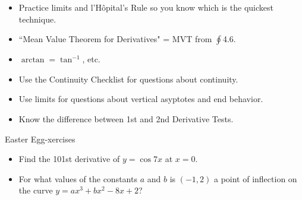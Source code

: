\documentclass[14pt]{beamer}
\begin{document}
\begin{frame}
\footnotesize
\begin{itemize}
\item Practice limits and l'H\^{o}pital's Rule so you know which is the quickest technique.
\item ``Mean Value Theorem for Derivatives" = MVT from $\oint$4.6.
\item $\arctan=\tan^{-1}$, etc.
\item Use the Continuity Checklist for questions about continuity.
\item Use limits for questions about vertical asyptotes and end behavior.
\item Know the difference between 1st and 2nd Derivative Tests.
\end{itemize}
\end{frame}

\begin{frame}{\small Easter Egg-xercises}
\small
\begin{exe} \begin{itemize}
\item Find the 101st derivative of $y=\cos{7x}$ at $x=0$.
\item For what values of the constants $a$ and $b$ is $(-1,2)$ a point of inflection on the curve $y=ax^3+bx^2-8x+2$?
\end{itemize}\end{exe}
\end{frame}

\begin{comment}
\end{comment}
\end{document}
